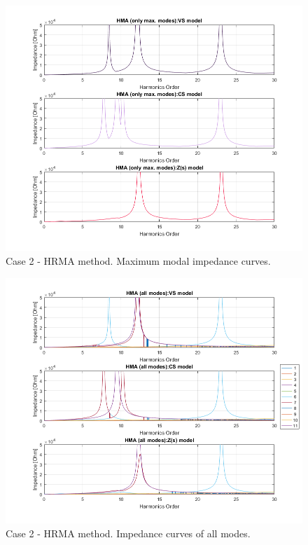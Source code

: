 \documentclass[12pt]{report} %
\begin{document}
\begin{figure}[htb]
	\centering
	\includegraphics[width=1\textwidth]{img/Case2/Case2_HMA_max.png}
  	\caption{Case 2 - HRMA method. Maximum modal impedance curves.}
  	\label{fig:case2hrma1}
\end{figure}
\FloatBarrier

\begin{figure}[htb]
	\centering
	\includegraphics[width=1\textwidth]{img/Case2/Case2_HMA_all.png}
  	\caption{Case 2 - HRMA method. Impedance curves of all modes.}
  	\label{fig:case2hrma2}
\end{figure}
\FloatBarrier
\end{document}
